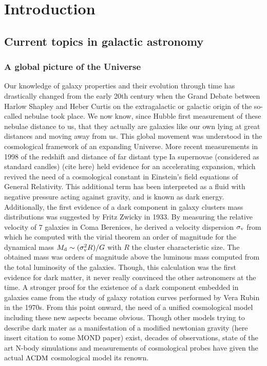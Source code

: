 \clearpage
\section{Introduction}
\label{sec:Intro}

\subsection{Current topics in galactic astronomy}

\subsubsection{A global picture of the Universe}

Our knowledge of galaxy properties and their evolution through time has drastically changed from the early 20th century when the Grand Debate between Harlow Shapley and Heber Curtis on the extragalactic or galactic origin of the so-called nebulae took place. We now know, since Hubble first measurement of these nebulae distance to us, that they actually are galaxies like our own lying at great distances and moving away from us. This global movement was understood in the cosmological framework of an expanding Universe. More recent measurements in 1998 of the redshift and distance of far distant type Ia supernovae (considered as standard candles) (cite here) held evidence for an accelerating expansion, which revived the need of a cosmological constant in Einstein's field equations of General Relativity. This additional term has been interpreted as a fluid with negative pressure acting against gravity, and is known as dark energy. Additionally, the first evidence of a dark component in galaxy clusters mass distributions was suggested by Fritz Zwicky in 1933. By measuring the relative velocity of $7$ galaxies in Coma Berenices, he derived a velocity dispersion $\sigma_{\rm{v}}$ from which he computed with the virial theorem an order of magnitude for the dynamical mass $M_{\rm{d}} \sim (\sigma_{\rm{v}}^2 R ) / G$ with $R$ the cluster characteristic size. The obtained mass was orders of magnitude above the luminous mass computed from the total luminosity of the galaxies. Though, this calculation was the first evidence for dark matter, it never really convinced the other astronomers at the time. A stronger proof for the existence of a dark component embedded in galaxies came from the study of galaxy rotation curves performed by Vera Rubin in the 1970s. From this point onward, the need of a unified cosmological model including these new aspects became obvious. Though other models trying to describe dark mater as a manifestation of a modified newtonian gravity (here insert citation to some MOND paper) exist, decades of observations, state of the art N-body simulations and measurements of cosmological probes have given the actual $\Lambda \rm{CDM}$ cosmological model its renown. \\


